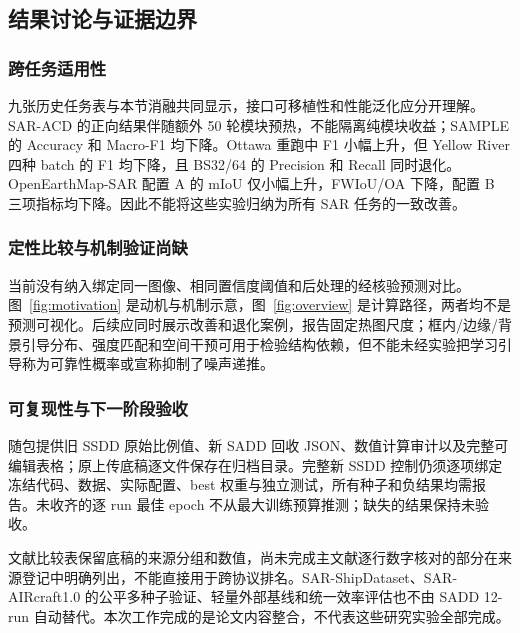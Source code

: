 \subsection{结果讨论与证据边界}\label{sec:limitations}
\subsubsection{跨任务适用性}
九张历史任务表与本节消融共同显示，接口可移植性和性能泛化应分开理解。SAR-ACD 的正向结果伴随额外 50 轮模块预热，不能隔离纯模块收益；SAMPLE 的 Accuracy 和 Macro-F1 均下降。Ottawa 重跑中 F1 小幅上升，但 Yellow River 四种 batch 的 F1 均下降，且 BS32/64 的 Precision 和 Recall 同时退化。OpenEarthMap-SAR 配置 A 的 mIoU 仅小幅上升，FWIoU/OA 下降，配置 B 三项指标均下降。因此不能将这些实验归纳为所有 SAR 任务的一致改善。

\subsubsection{定性比较与机制验证尚缺}
当前没有纳入绑定同一图像、相同置信度阈值和后处理的经核验预测对比。图~\ref{fig:motivation} 是动机与机制示意，图~\ref{fig:overview} 是计算路径，两者均不是预测可视化。后续应同时展示改善和退化案例，报告固定热图尺度；框内/边缘/背景引导分布、强度匹配和空间干预可用于检验结构依赖，但不能未经实验把学习引导称为可靠性概率或宣称抑制了噪声递推。

\subsubsection{可复现性与下一阶段验收}
随包提供旧 SSDD 原始比例值、新 SADD 回收 JSON、数值计算审计以及完整可编辑表格；原上传底稿逐文件保存在归档目录。完整新 SSDD 控制仍须逐项绑定冻结代码、数据、实际配置、best 权重与独立测试，所有种子和负结果均需报告。未收齐的逐 run 最佳 epoch 不从最大训练预算推测；缺失的结果保持未验收。

文献比较表保留底稿的来源分组和数值，尚未完成主文献逐行数字核对的部分在来源登记中明确列出，不能直接用于跨协议排名。SAR-ShipDataset、SAR-AIRcraft1.0 的公平多种子验证、轻量外部基线和统一效率评估也不由 SADD 12-run 自动替代。本次工作完成的是论文内容整合，不代表这些研究实验全部完成。
